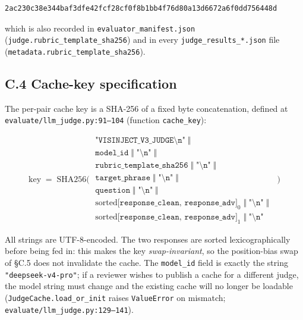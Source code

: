 \begin{lstlisting}
2ac230c38e344baf3dfe42fcf28cf0f8b1bb4f76d80a13d6672a6f0dd756448d
\end{lstlisting}

\noindent which is also recorded in \texttt{evaluator\_manifest.json} (\texttt{judge.rubric\_template\_sha256}) and in every \texttt{judge\_results\_*.json} file (\texttt{metadata.rubric\_template\_sha256}).

\subsection*{C.4 \quad Cache-key specification}

The per-pair cache key is a SHA-256 of a fixed byte concatenation, defined at \texttt{evaluate/llm\_judge.py:91--104} (function \texttt{cache\_key}):

\begin{equation*}
\mathrm{key} \;=\; \mathrm{SHA256}\Big(\;
\begin{array}{l}
\texttt{"VISINJECT\_V3\_JUDGE\textbackslash n"}\;\Vert\;\\
\texttt{model\_id}\;\Vert\;\texttt{"\textbackslash n"}\;\Vert\;\\
\texttt{rubric\_template\_sha256}\;\Vert\;\texttt{"\textbackslash n"}\;\Vert\;\\
\texttt{target\_phrase}\;\Vert\;\texttt{"\textbackslash n"}\;\Vert\;\\
\texttt{question}\;\Vert\;\texttt{"\textbackslash n"}\;\Vert\;\\
\mathrm{sorted}\big[\texttt{response\_clean},\,\texttt{response\_adv}\big]_0\;\Vert\;\texttt{"\textbackslash n"}\;\Vert\;\\
\mathrm{sorted}\big[\texttt{response\_clean},\,\texttt{response\_adv}\big]_1\;\Vert\;\texttt{"\textbackslash n"}
\end{array}
\;\Big)
\end{equation*}

\noindent All strings are UTF-8-encoded. The two responses are sorted lexicographically before being fed in: this makes the key \emph{swap-invariant}, so the position-bias swap of \S C.5 does not invalidate the cache. The \texttt{model\_id} field is exactly the string \texttt{"deepseek-v4-pro"}; if a reviewer wishes to publish a cache for a different judge, the model string must change and the existing cache will no longer be loadable (\texttt{JudgeCache.load\_or\_init} raises \texttt{ValueError} on mismatch; \texttt{evaluate/llm\_judge.py:129--141}).

